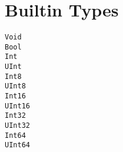 \section{Builtin Types}

\begin{lstlisting}
Void
Bool
Int
UInt
Int8
UInt8
Int16
UInt16
Int32
UInt32
Int64
UInt64
\end{lstlisting}
